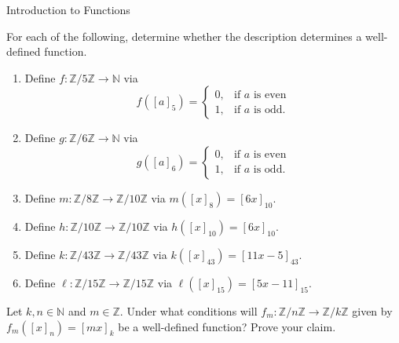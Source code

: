 \begin{section}{Introduction to Functions}
\begin{problem}\label{prob:well defined}
For each of the following, determine whether the description determines a well-defined function.
\begin{enumerate}[label=\textrm{(\alph*)}]
\item Define $f:\mathbb{Z}/5\mathbb{Z}\to \mathbb{N}$ via
\[
f([a]_5)=\begin{cases}
0, & \mbox{if } a\mbox{ is even}\\
1, & \mbox{if } a\mbox{ is odd}.
\end{cases}
\]
\item Define $g:\mathbb{Z}/6\mathbb{Z}\to \mathbb{N}$ via
\[
g([a]_6)=\begin{cases}
0, & \mbox{if } a\mbox{ is even}\\
1, & \mbox{if } a\mbox{ is odd}.
\end{cases}
\]
\item\label{mod 8 to mod 10} Define $m:\mathbb{Z}/8\mathbb{Z}\to \mathbb{Z}/10\mathbb{Z}$ via $m([x]_{8})=[6x]_{10}$.
\item\label{mod 10 to mod 10} Define $h:\mathbb{Z}/10\mathbb{Z}\to \mathbb{Z}/10\mathbb{Z}$ via $h([x]_{10})=[6x]_{10}$.
\item\label{mod 43 to mod 43} Define $k:\mathbb{Z}/43\mathbb{Z}\to \mathbb{Z}/43\mathbb{Z}$ via $k([x]_{43})=[11x-5]_{43}$.
\item\label{mod 15 to mod 15} Define $\ell:\mathbb{Z}/15\mathbb{Z}\to \mathbb{Z}/15\mathbb{Z}$ via $\ell([x]_{15})=[5x-11]_{15}$.
\end{enumerate}
\end{problem}

\begin{problem}
Let $k,n\in\mathbb{N}$ and $m\in\mathbb{Z}$. Under what conditions will $f_m: \mathbb{Z}/n\mathbb{Z}\to \mathbb{Z}/k\mathbb{Z}$ given by $f_m([x]_n) = [mx]_k$ be a well-defined function?  Prove your claim.
\end{problem}

\end{section}